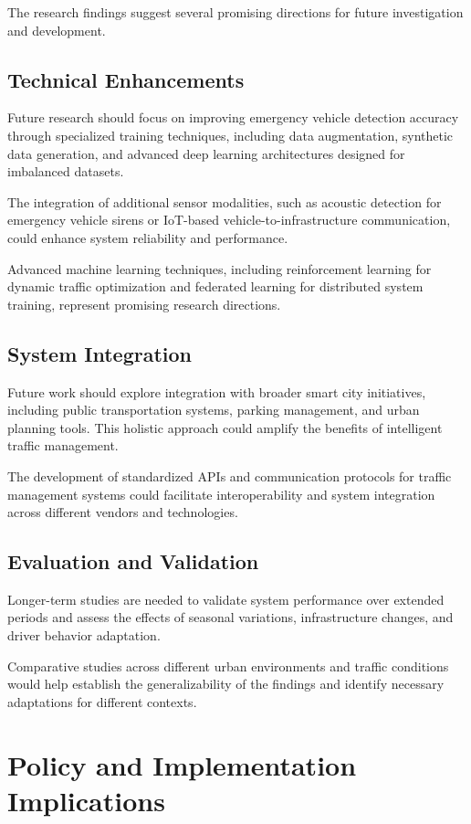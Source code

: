 The research findings suggest several promising directions for future investigation and development.

\subsection{Technical Enhancements}
Future research should focus on improving emergency vehicle detection accuracy through specialized training techniques, including data augmentation, synthetic data generation, and advanced deep learning architectures designed for imbalanced datasets.

The integration of additional sensor modalities, such as acoustic detection for emergency vehicle sirens or IoT-based vehicle-to-infrastructure communication, could enhance system reliability and performance.

Advanced machine learning techniques, including reinforcement learning for dynamic traffic optimization and federated learning for distributed system training, represent promising research directions.

\subsection{System Integration}
Future work should explore integration with broader smart city initiatives, including public transportation systems, parking management, and urban planning tools. This holistic approach could amplify the benefits of intelligent traffic management.

The development of standardized APIs and communication protocols for traffic management systems could facilitate interoperability and system integration across different vendors and technologies.

\subsection{Evaluation and Validation}
Longer-term studies are needed to validate system performance over extended periods and assess the effects of seasonal variations, infrastructure changes, and driver behavior adaptation.

Comparative studies across different urban environments and traffic conditions would help establish the generalizability of the findings and identify necessary adaptations for different contexts.

\section{Policy and Implementation Implications}
\label{sec:policy_implications}

